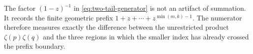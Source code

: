 \begin{remark}
The factor $(1-z)^{-1}$ in \eqref{eq:two-tail-generator} is not an
artifact of summation.  It records the finite geometric prefix
$1+z+\cdots+z^{\min(m,k)-1}$.  The numerator therefore measures exactly
the difference between the unrestricted product $\zeta(p)\zeta(q)$ and
the three regions in which the smaller index has already crossed the
prefix boundary.
\end{remark}

